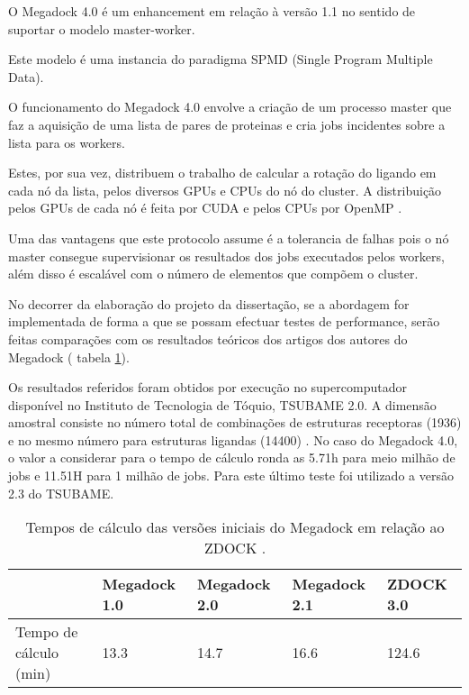 O Megadock 4.0 é um enhancement em relação à versão 1.1 no sentido de suportar o modelo master-worker. 

Este modelo é uma instancia do paradigma SPMD (Single Program Multiple Data).

O funcionamento do Megadock 4.0 envolve a criação de um processo master que faz a aquisição de uma lista de pares de proteinas e cria jobs incidentes sobre a lista para os workers.

 Estes, por sua vez, distribuem o trabalho de calcular a rotação do ligando em cada nó da lista, pelos diversos GPUs e CPUs do nó do cluster. A distribuição pelos GPUs de cada nó é feita por CUDA e pelos CPUs por OpenMP \cite{megadock40}. 
 
 Uma das vantagens que este protocolo assume é a tolerancia de falhas pois o nó master consegue supervisionar os resultados dos jobs executados pelos workers, além disso é escalável com o número de elementos que compõem o cluster.
 
 No decorrer da elaboração do projeto da dissertação, se a abordagem for implementada de forma a que se possam efectuar testes de performance, serão feitas comparações com os resultados teóricos dos artigos dos autores do Megadock ( tabela \ref{tab1}).
 
  Os resultados referidos foram obtidos por execução no supercomputador disponível no Instituto de Tecnologia de Tóquio, TSUBAME 2.0. A dimensão amostral consiste no número total de combinações de estruturas receptoras (1936) e no mesmo número para estruturas ligandas (14400)  . No caso do Megadock 4.0, o valor a considerar para o tempo de cálculo ronda as 5.71h para meio milhão de jobs e 11.51H para 1 milhão de jobs. Para este último teste foi utilizado a versão 2.3 do TSUBAME\cite{megadock40}. 
  
\begin{table}[]
\centering


\begin{tabular}{l|l|l|l|l|}
\cline{2-5}
                                             & Megadock 1.0 & Megadock 2.0 & Megadock 2.1 & ZDOCK 3.0 \\ \hline
\multicolumn{1}{|l|}{Tempo de cálculo (min)} & 13.3         & 14.7         & 16.6         & 124.6     \\ \hline
\end{tabular}
\caption{Tempos de cálculo das versões iniciais do Megadock em relação ao ZDOCK \cite{megadock}.}
\label{tab1}
\end{table}


